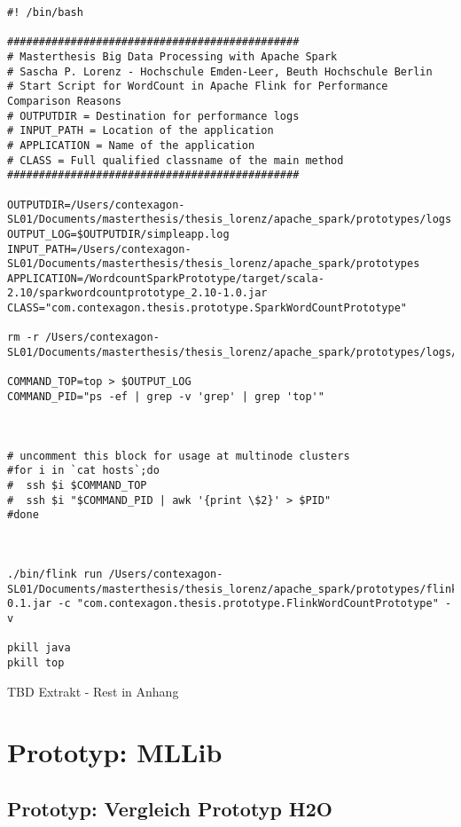 \begin{lstlisting}[label=shellflink,caption=Shellscript zum Start des Flink WordCountPrototyp]
#! /bin/bash

##############################################
# Masterthesis Big Data Processing with Apache Spark
# Sascha P. Lorenz - Hochschule Emden-Leer, Beuth Hochschule Berlin
# Start Script for WordCount in Apache Flink for Performance Comparison Reasons	
# OUTPUTDIR = Destination for performance logs
# INPUT_PATH = Location of the application 
# APPLICATION = Name of the application
# CLASS = Full qualified classname of the main method
##############################################

OUTPUTDIR=/Users/contexagon-SL01/Documents/masterthesis/thesis_lorenz/apache_spark/prototypes/logs
OUTPUT_LOG=$OUTPUTDIR/simpleapp.log
INPUT_PATH=/Users/contexagon-SL01/Documents/masterthesis/thesis_lorenz/apache_spark/prototypes
APPLICATION=/WordcountSparkPrototype/target/scala-2.10/sparkwordcountprototype_2.10-1.0.jar
CLASS="com.contexagon.thesis.prototype.SparkWordCountPrototype"

rm -r /Users/contexagon-SL01/Documents/masterthesis/thesis_lorenz/apache_spark/prototypes/logs/flinkOutput.out

COMMAND_TOP=top > $OUTPUT_LOG
COMMAND_PID="ps -ef | grep -v 'grep' | grep 'top'"



# uncomment this block for usage at multinode clusters
#for i in `cat hosts`;do
#  ssh $i $COMMAND_TOP
#  ssh $i "$COMMAND_PID | awk '{print \$2}' > $PID"
#done



./bin/flink run /Users/contexagon-SL01/Documents/masterthesis/thesis_lorenz/apache_spark/prototypes/flink_tests/WordCountPrototypeFlink/target/WordCountFlinkPrototype-0.1.jar -c "com.contexagon.thesis.prototype.FlinkWordCountPrototype" -v

pkill java
pkill top
\end{lstlisting}

TBD Extrakt - Rest in Anhang

\section{Prototyp: MLLib }
\label{section:prototyp mllib}



\subsection{Prototyp: Vergleich Prototyp H2O }
\label{section:vergleich h2o}

